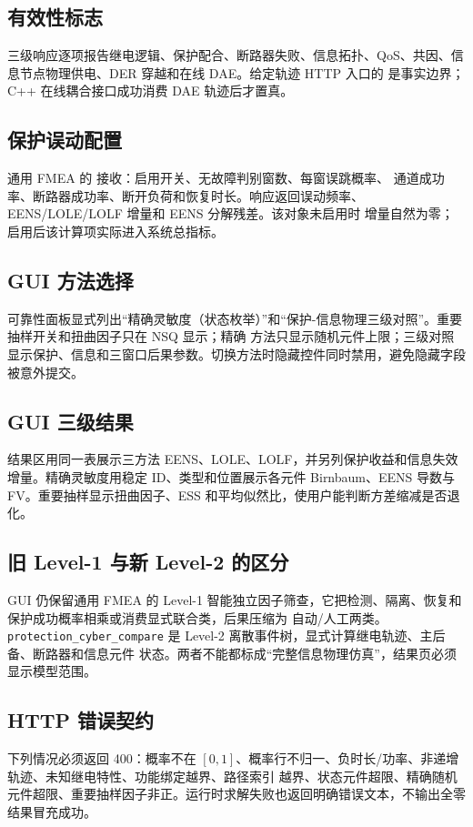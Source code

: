 \subsection{有效性标志}
三级响应逐项报告继电逻辑、保护配合、断路器失败、信息拓扑、QoS、共因、信息节点物理供电、DER 穿越和在线 DAE。给定轨迹
HTTP 入口的  是事实边界；C++ 在线耦合接口成功消费 DAE 轨迹后才置真。

\subsection{保护误动配置}
通用 FMEA 的  接收：启用开关、无故障判别窗数、每窗误跳概率、
通道成功率、断路器成功率、断开负荷和恢复时长。响应返回误动频率、EENS/LOLE/LOLF 增量和 EENS 分解残差。该对象未启用时
增量自然为零；启用后该计算项实际进入系统总指标。

\subsection{GUI 方法选择}
可靠性面板显式列出“精确灵敏度（状态枚举）”和“保护-信息物理三级对照”。重要抽样开关和扭曲因子只在 NSQ 显示；精确
方法只显示随机元件上限；三级对照显示保护、信息和三窗口后果参数。切换方法时隐藏控件同时禁用，避免隐藏字段被意外提交。

\subsection{GUI 三级结果}
结果区用同一表展示三方法 EENS、LOLE、LOLF，并另列保护收益和信息失效增量。精确灵敏度用稳定 ID、类型和位置展示各元件
Birnbaum、EENS 导数与 FV。重要抽样显示扭曲因子、ESS 和平均似然比，使用户能判断方差缩减是否退化。

\subsection{旧 Level-1 与新 Level-2 的区分}
GUI 仍保留通用 FMEA 的 Level-1 智能独立因子筛查，它把检测、隔离、恢复和保护成功概率相乘或消费显式联合类，后果压缩为
自动/人工两类。\texttt{protection\_cyber\_compare} 是 Level-2 离散事件树，显式计算继电轨迹、主后备、断路器和信息元件
状态。两者不能都标成“完整信息物理仿真”，结果页必须显示模型范围。

\subsection{HTTP 错误契约}
下列情况必须返回 400：概率不在 $[0,1]$、概率行不归一、负时长/功率、非递增轨迹、未知继电特性、功能绑定越界、路径索引
越界、状态元件超限、精确随机元件超限、重要抽样因子非正。运行时求解失败也返回明确错误文本，不输出全零结果冒充成功。


